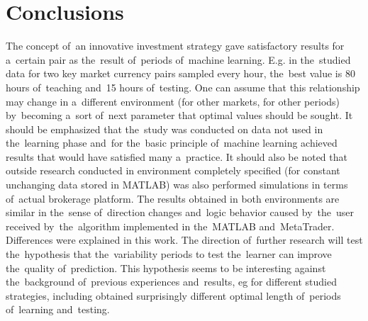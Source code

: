 \documentclass[runningheads,a4paper]{llncs}
\begin{document}
\section{Conclusions}

The concept of~an innovative investment strategy gave satisfactory results for a~certain pair as the~result of~periods of~machine learning. E.g. in the~studied data for two key market currency pairs sampled every hour, the~best value is 80 hours of~teaching and~15 hours of~testing. One can assume that this relationship may change in a~different environment (for other markets, for other periods) by~becoming a~sort of~next parameter that optimal values should be sought. It should be emphasized that the~study was conducted on data not used in the~learning phase and~for the~basic principle of~machine learning achieved results that would have satisfied many a~practice. It should also be noted that outside research conducted in environment completely specified (for constant unchanging data stored in MATLAB) was also performed simulations in terms of~actual brokerage platform. The results obtained in both environments are similar in the~sense of~direction changes and~logic behavior caused by~the~user received by~the~algorithm implemented in the~MATLAB and~MetaTrader. Differences were explained in this work.
The direction of~further research will test the~hypothesis that the~variability periods to test the~learner can improve the~quality of~prediction. This hypothesis seems to be interesting against the~background of~previous experiences and~results, eg for different studied strategies, including \cite{Wilinski2014}\cite{Wilinski}\cite{sinclare}\cite{krutsinger} obtained surprisingly different optimal length of~periods of~learning and~testing.





\end{document}
